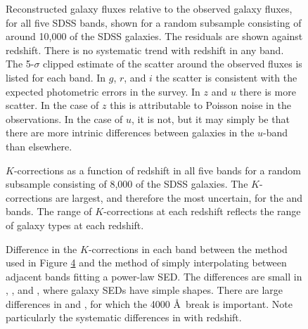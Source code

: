 \clearpage
{}
\begin{figure}
\figurenum{\fignum}
\caption{\label{k_model_plot} Reconstructed galaxy fluxes relative to
the observed galaxy fluxes, for all five SDSS bands, shown for a
random subsample consisting of around 10,000 of the SDSS galaxies. The
residuals are shown against redshift.  There is no systematic trend
with redshift in any band. The 5-$\sigma$ clipped estimate of the
scatter around the observed fluxes is listed for each band. In $g$,
$r$, and $i$ the scatter is consistent with the expected photometric
errors in the survey. In $z$ and $u$ there is more scatter. In the
case of $z$ this is attributable to Poisson noise in the
observations. In the case of $u$, it is not, but it may simply be that
there are more intrinic differences between galaxies in the $u$-band
than elsewhere.}
\end{figure}

\clearpage
{}
\begin{figure}
\figurenum{\fignum}
\caption{\label{main_colors_plot} }
\end{figure}

\clearpage
{}
\begin{figure}
\figurenum{\fignum}
\caption{\label{lrg_colors_plot} }
\end{figure}

\clearpage
{}
\begin{figure}
\figurenum{\fignum}
\caption{\label{kcorrect.sample8b15} $K$-corrections as a function of
redshift in all five bands for a random subsample consisting of 8,000
of the SDSS galaxies. The $K$-corrections are largest, and therefore
the most uncertain, for the  and  bands. The
range of $K$-corrections at each redshift reflects the range of galaxy
types at each redshift.}
\end{figure}

\clearpage
{}
\begin{figure}
\figurenum{\fignum}
\caption{\label{ciCompare.sample8b15} Difference in the
$K$-corrections in each band between the method used in Figure
\ref{kcorrect.sample8b15} and the method of simply interpolating
between adjacent bands fitting a power-law SED. The differences are
small in , , and , where galaxy
SEDs have simple shapes. There are large differences in 
and , for which the 4000 \AA\ break is important. Note
particularly the systematic differences in  with
redshift.}
\end{figure}

